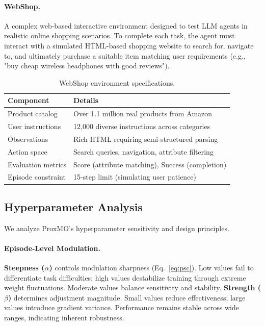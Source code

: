 \documentclass[11pt]{article}
\begin{document}
\paragraph{WebShop.}
A complex web-based interactive environment designed to test LLM agents in realistic online shopping scenarios. To complete each task, the agent must interact with a simulated HTML-based shopping website to search for, navigate to, and ultimately purchase a suitable item matching user requirements (e.g., "buy cheap wireless headphones with good reviews").

\begin{table}[t]
\centering
\small
\begin{tabular}{ll}
\toprule
\textbf{Component} & \textbf{Details} \\
\midrule
Product catalog & Over 1.1 million real products from Amazon \\
User instructions & 12,000 diverse instructions across categories \\
Observations & Rich HTML requiring semi-structured parsing \\
Action space & Search queries, navigation, attribute filtering \\
Evaluation metrics & Score (attribute matching), Success (completion) \\
Episode constraint & 15-step limit (simulating user patience) \\
\bottomrule
\end{tabular}
\caption{WebShop environment specifications.}
\label{tab:webshop_specs}
\end{table}

\subsection{Hyperparameter Analysis}
\label{sec:appendix_hyperparam}

We analyze ProxMO's hyperparameter sensitivity and design principles.

\paragraph{Episode-Level Modulation.}
\textbf{Steepness ($\alpha$)} controls modulation sharpness (Eq.~\ref{eq:psc}). Low values fail to differentiate task difficulties; high values destabilize training through extreme weight fluctuations. Moderate values balance sensitivity and stability. \textbf{Strength ($\beta$)} determines adjustment magnitude. Small values reduce effectiveness; large values introduce gradient variance. Performance remains stable across wide ranges, indicating inherent robustness.
\end{document}
